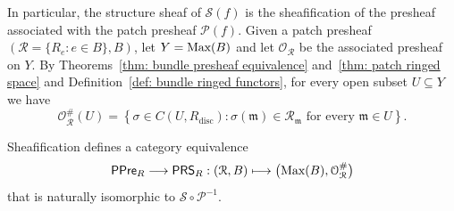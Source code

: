 \documentclass[11pt]{amsart}
\def\O{{\mathcal{O}}}
\begin{document}
In particular, the structure sheaf of \(\mathcal S(f)\) is the sheafification of the presheaf associated with the patch presheaf \(\mathcal P(f)\).
Given a patch presheaf $({\mathcal R}=\{R_e:e\in B\},B)$, let $Y=\mbox{\rm Max}(B)$ and let $\O_{{\mathcal R}}$ be the associated presheaf on $Y$. By Theorems~\ref{thm: bundle presheaf equivalence} and~\ref{thm: patch ringed space} and Definition~\ref{def: bundle ringed functors}, for every open subset $U\subseteq Y$ we have 
\begin{equation}\label{eq: sheafification}
    \mathcal O_{{\mathcal R}}^{\#}(U) = \left\{\sigma\in C(U,R_{\mathrm{disc}}): \sigma(\mathfrak m)\in{\mathcal R}_{\mathfrak m}\text{ for every }\mathfrak m\in U \right\}.
\end{equation}

\begin{corollary}\label{cor: sheafification equivalence}
Sheafification defines a category equivalence
$$ \mathsf{PPre}_R\longrightarrow\mathsf{PRS}_R: (\mathcal R,B)\longmapsto
\bigl(\mbox{\rm Max}(B),\mathcal O_{\mathcal R}^{\#}\bigr)$$
that is  naturally isomorphic to $\mathcal S\circ\mathcal P^{-1}$.
\end{corollary}
\end{document}
